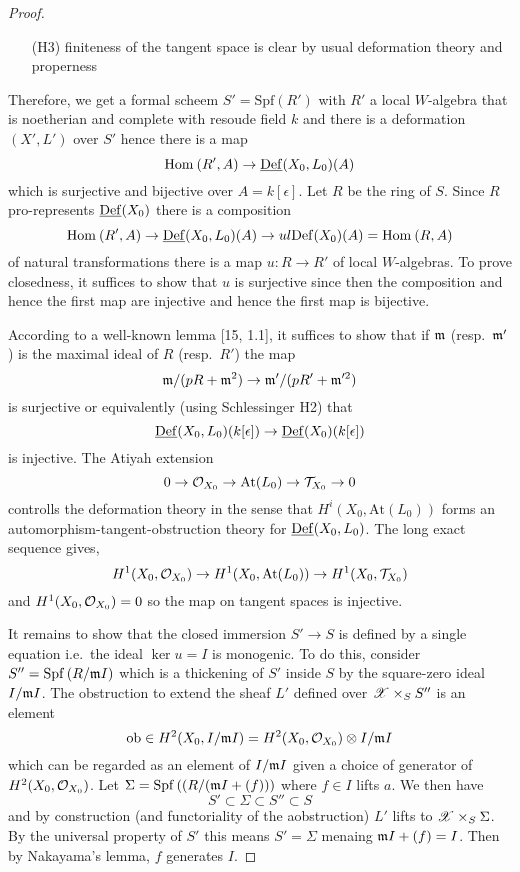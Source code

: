 \documentclass[12pt]{article}
\newcommand{\Def}{\mathrm{Def}}
\newcommand{\Spf}[1]{\mathrm{Spf}\left( #1 \right)}
\newcommand{\At}{\mathrm{At}}
\newcommand{\ob}{\mathrm{ob}}
\begin{document}
\begin{proof}
\begin{enumerate}
\item[(H3)] finiteness of the tangent space is clear by usual deformation theory and properness
\end{enumerate}
Therefore, we get a formal scheem $S' = \Spf{R'}$ with $R'$ a local $W$-algebra that is noetherian and complete with resoude field $k$ and there is a deformation $(X', L')$ over $S'$ hence there is a map
\[ \Hom{}{R'}{A} \to \ul{\Def}(X_0, L_0)(A) \]
which is surjective and bijective over $A = k[\epsilon]$. Let $R$ be the ring of $S$. Since $R$ pro-represents $\ul{\Def}(X_0)$ there is a composition
\[ \Hom{}{R'}{A} \to \ul{\Def}(X_0, L_0)(A) \to \\ul{\Def}(X_0)(A) = \Hom{}{R}{A} \]
of natural transformations there is a map $u : R \to R'$ of local $W$-algebras. To prove closedness, it suffices to show that $u$ is surjective since then the composition and hence the first map are injective and hence the first map is bijective. 
\par 
According to a well-known lemma [15, 1.1], it suffices to show that if $\mathfrak{m}$ (resp.\ $\mathfrak{m}'$) is the maximal ideal of $R$ (resp.\ $R'$) the map
\[ \mathfrak{m} / (p R + \mathfrak{m}^2) \to \mathfrak{m}' / (p R' + \mathfrak{m}'^2) \]
is surjective or equivalently (using Schlessinger H2) that
\[ \ul{\Def}(X_0, L_0)(k[\epsilon]) \to \ul{\Def}(X_0)(k[\epsilon]) \]
is injective. The Atiyah extension
\[ 0 \to \struct{X_0} \to \At(L_0) \to \T_{X_0} \to 0 \]
controlls the deformation theory in the sense that $H^i(X_0, \At(L_0))$ forms an automorphism-tangent-obstruction theory for $\ul{\Def}(X_0, L_0)$. The long exact sequence gives,
\[ H^1(X_0, \struct{X_0}) \to H^1(X_0, \At(L_0)) \to H^1(X_0, \T_{X_0}) \]
and $H^1(X_0, \mathcal{O}_{X_0}) = 0$ so the map on tangent spaces is injective. 
\par 
It remains to show that the closed immersion $S' \to S$ is defined by a single equation i.e.\ the ideal $\ker{u} = I$ is monogenic. To do this, consider $S'' = \Spf{R/\m I}$ which is a thickening of $S'$ inside $S$ by the square-zero ideal $I / \mathfrak{m} I$. The obstruction to extend the sheaf $L'$ defined over $\mathscr{X} \times_S S''$ is an element
\[ \ob \in H^2(X_0, I / \m I) = H^2(X_0, \struct{X_0}) \ot I/\m I \]
which can be regarded as an element of $I / \mathfrak{m} I$ given a choice of generator of $H^2(X_0, \mathcal{O}_{X_0})$.  Let $\Sigma = \Spf{(R / (\m I + (f))}$ where $f \in I$ lifts $a$. We then have
\[ S' \subset \Sigma \subset S'' \subset S \]
and by construction (and functoriality of the aobstruction) $L'$ lifts to $\mathscr{X} \times_S \Sigma$. By the universal property of $S'$ this means $S' = \Sigma$ menaing $\mathfrak{m} I + (f) = I$. Then by Nakayama's lemma, $f$ generates $I$. 
\end{proof}
\end{document}
